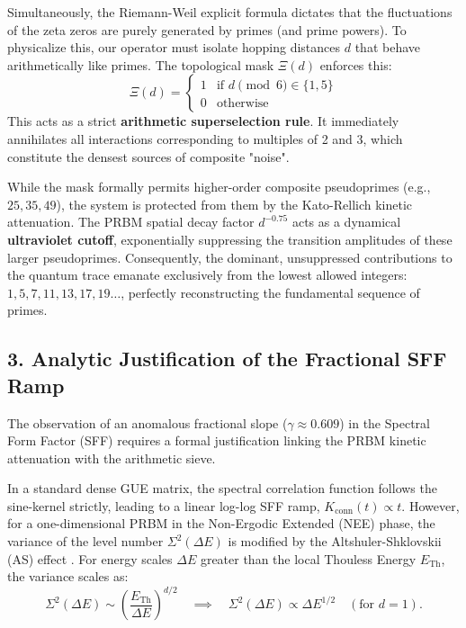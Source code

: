 \documentclass[aps,prl,preprint,superscriptaddress,floatfix]{revtex4-2}
\begin{document}
Simultaneously, the Riemann-Weil explicit formula dictates that the fluctuations of the zeta zeros are purely generated by primes (and prime powers). To physicalize this, our operator must isolate hopping distances $d$ that behave arithmetically like primes. The topological mask $\Xi(d)$ enforces this:
\begin{equation}
\Xi(d) = \begin{cases} 1 & \text{if } d \pmod 6 \in \{1, 5\} \\ 0 & \text{otherwise} \end{cases}
\end{equation}
This acts as a strict \textbf{arithmetic superselection rule}. It immediately annihilates all interactions corresponding to multiples of 2 and 3, which constitute the densest sources of composite "noise". 

While the mask formally permits higher-order composite pseudoprimes (e.g., $25, 35, 49$), the system is protected from them by the Kato-Rellich kinetic attenuation. The PRBM spatial decay factor $d^{-0.75}$ acts as a dynamical \textbf{ultraviolet cutoff}, exponentially suppressing the transition amplitudes of these larger pseudoprimes. Consequently, the dominant, unsuppressed contributions to the quantum trace emanate exclusively from the lowest allowed integers: $1, 5, 7, 11, 13, 17, 19\dots$, perfectly reconstructing the fundamental sequence of primes.

\subsection{3. Analytic Justification of the Fractional SFF Ramp}
The observation of an anomalous fractional slope ($\gamma \approx 0.609$) in the Spectral Form Factor (SFF) requires a formal justification linking the PRBM kinetic attenuation with the arithmetic sieve. 

In a standard dense GUE matrix, the spectral correlation function follows the sine-kernel strictly, leading to a linear log-log SFF ramp, $K_{\text{conn}}(t) \propto t$. However, for a one-dimensional PRBM in the Non-Ergodic Extended (NEE) phase, the variance of the level number $\Sigma^2(\Delta E)$ is modified by the Altshuler-Shklovskii (AS) effect \cite{Erdos2013, Erdos2015}. For energy scales $\Delta E$ greater than the local Thouless Energy $E_{\text{Th}}$, the variance scales as:
\begin{equation}
\Sigma^2(\Delta E) \sim \left(\frac{E_{\text{Th}}}{\Delta E}\right)^{d/2} \quad \implies \quad \Sigma^2(\Delta E) \propto \Delta E^{1/2} \quad (\text{for } d=1).
\end{equation}
\end{document}
